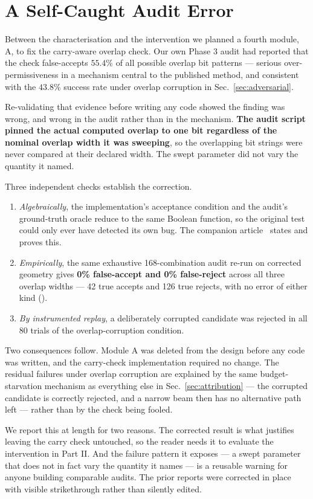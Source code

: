 \section{A Self-Caught Audit Error}
\label{sec:retraction}

Between the characterisation and the intervention we planned a fourth
module, A, to fix the carry-aware overlap check. Our own Phase 3 audit had
reported that the check false-accepts $55.4\%$ of all possible overlap bit
patterns --- serious over-permissiveness in a mechanism central to the
published method, and consistent with the $43.8\%$ success rate under
overlap corruption in Sec.~\ref{sec:adversarial}.

Re-validating that evidence before writing any code showed the finding was
wrong, and wrong in the audit rather than in the mechanism. \textbf{The audit
script pinned the actual computed overlap to one bit regardless of the
nominal overlap width it was sweeping}, so the overlapping bit strings were
never compared at their declared width. The swept parameter did not vary the
quantity it named.

Three independent checks establish the correction.

\begin{enumerate}\itemsep2pt
\item \emph{Algebraically}, the implementation's acceptance condition and the
audit's ground-truth oracle reduce to the same Boolean function, so the
original test could only ever have detected its own bug. The companion
article~\cite{methodpaper} states and proves this.
\item \emph{Empirically}, the same exhaustive 168-combination audit re-run on
corrected geometry gives \textbf{0\% false-accept and 0\% false-reject}
across all three overlap widths --- 42 true accepts and 126 true rejects,
with no error of either kind (\SIaudit{}).
\item \emph{By instrumented replay}, a deliberately corrupted candidate was
rejected in all 80 trials of the overlap-corruption condition.
\end{enumerate}

Two consequences follow. Module A was deleted from the design before any
code was written, and the carry-check implementation required no change. The
residual failures under overlap corruption are explained by the same
budget-starvation mechanism as everything else in Sec.~\ref{sec:attribution}
--- the corrupted candidate is correctly rejected, and a narrow beam then has
no alternative path left --- rather than by the check being fooled.

We report this at length for two reasons. The corrected result is what
justifies leaving the carry check untouched, so the reader needs it to
evaluate the intervention in Part II. And the failure pattern it exposes ---
a swept parameter that does not in fact vary the quantity it names --- is a
reusable warning for anyone building comparable audits. The prior reports
were corrected in place with visible strikethrough rather than silently
edited.

